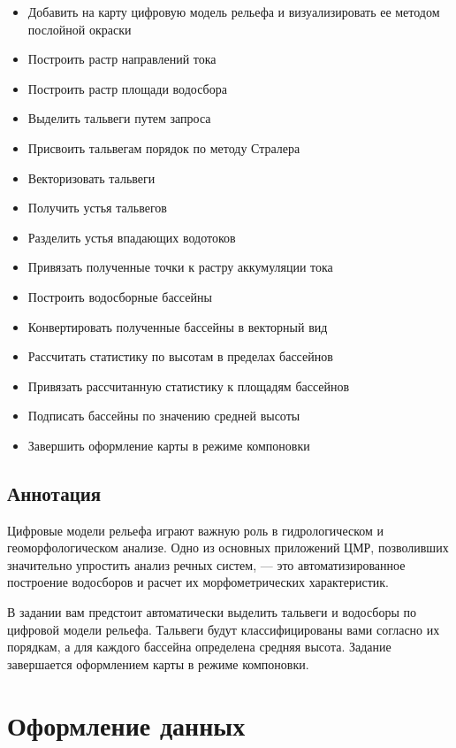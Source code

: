 \documentclass[]{book}
\providecommand{\tightlist}{%
  \setlength{\itemsep}{0pt}\setlength{\parskip}{0pt}}
\theoremstyle{definition}
\theoremstyle{definition}
\theoremstyle{definition}
\theoremstyle{remark}
\begin{document}
\begin{itemize}
\tightlist
\item
  Добавить на карту цифровую модель рельефа и визуализировать ее методом
  послойной окраски
\item
  Построить растр направлений тока
\item
  Построить растр площади водосбора
\item
  Выделить тальвеги путем запроса
\item
  Присвоить тальвегам порядок по методу Стралера
\item
  Векторизовать тальвеги
\item
  Получить устья тальвегов
\item
  Разделить устья впадающих водотоков
\item
  Привязать полученные точки к растру аккумуляции тока
\item
  Построить водосборные бассейны
\item
  Конвертировать полученные бассейны в векторный вид
\item
  Рассчитать статистику по высотам в пределах бассейнов
\item
  Привязать рассчитанную статистику к площадям бассейнов
\item
  Подписать бассейны по значению средней высоты
\item
  Завершить оформление карты в режиме компоновки
\end{itemize}

\hypertarget{dem-annotation}{%
\subsection{Аннотация}\label{dem-annotation}}

Цифровые модели рельефа играют важную роль в гидрологическом и
геоморфологическом анализе. Одно из основных приложений ЦМР, позволивших
значительно упростить анализ речных систем, --- это автоматизированное
построение водосборов и расчет их морфометрических характеристик.

В задании вам предстоит автоматически выделить тальвеги и водосборы по
цифровой модели рельефа. Тальвеги будут классифицированы вами согласно
их порядкам, а для каждого бассейна определена средняя высота. Задание
завершается оформлением карты в режиме компоновки.

\hypertarget{dem-design}{%
\section{Оформление данных}\label{dem-design}}
\end{document}

